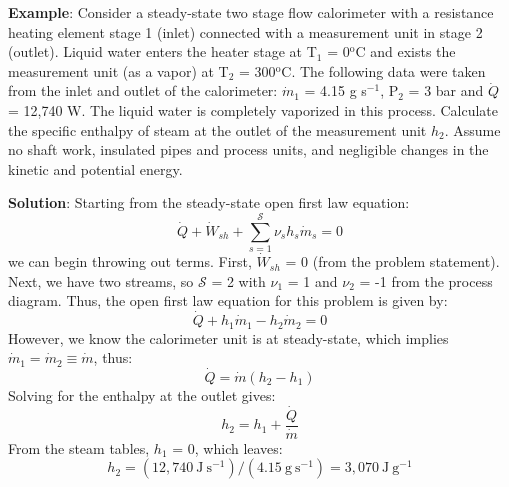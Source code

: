 \documentclass[11pt]{article}
\theoremstyle{definition}
\begin{document}
\begin{mdframed}[backgroundcolor=lgray]
\noindent\textbf{Example}: Consider a steady-state two stage flow calorimeter with a resistance heating element stage 1 (inlet) connected with a measurement unit in stage 2 (outlet).
Liquid water enters the heater stage at T$_{\mathrm{1}}$ = 0$^{\mathrm{o}}$C and exists the measurement unit (as a vapor) at T$_{\mathrm{2}}$ = 300$^{\mathrm{o}}$C.
The following data were taken from the inlet and outlet of the calorimeter: $\dot{m}_{1}$ = 4.15 g s$^{\mathrm{-1}}$, P$_{\mathrm{2}}$ = 3 bar and $\dot{Q}$ = 12,740 W.
The liquid water is completely vaporized in this process. Calculate the specific enthalpy of steam at the outlet of the measurement unit $h_{2}$.
Assume no shaft work, insulated pipes and process units, and negligible changes in the kinetic and potential energy.

\vspace{0.15in}
\noindent\textbf{Solution}: Starting from the steady-state open first law equation:
\begin{equation}
	\dot{Q}+\dot{W}_{sh} + \sum_{s=1}^{\mathcal{S}}\nu_{s}h_{s}\dot{m}_{s}  =  0
\end{equation}we can begin throwing out terms. First, $\dot{W}_{sh}$ = 0 (from the problem statement).
Next, we have two streams, so $\mathcal{S}$ = 2 with $\nu_{1}$ = 1 and $\nu_{2}$ = -1 from the process diagram.
Thus, the open first law equation for this problem is given by:
\begin{equation}
	\dot{Q}+h_{1}\dot{m}_{1}-h_{2}\dot{m}_{2} = 0
\end{equation}However, we know the calorimeter unit is at steady-state, which implies $\dot{m}_{1}=\dot{m}_{2}\equiv\dot{m}$, thus:
\begin{equation}
	\dot{Q} = \dot{m}\left(h_{2} - h_{1}\right)
\end{equation}Solving for the enthalpy at the outlet gives:
\begin{equation}
	h_{2} = h_{1}+\frac{\dot{Q}}{\dot{m}}
\end{equation}From the steam tables, $h_{1}$ = 0, which leaves:
\begin{equation}
	h_{2} = \left(12,740~\mathrm{J~s^{-1}}\right)/\left(4.15~\mathrm{g~s^{-1}}\right) = 3,070~\mathrm{J~g^{-1}}
\end{equation}
\end{mdframed}

\clearpage



\end{document}
